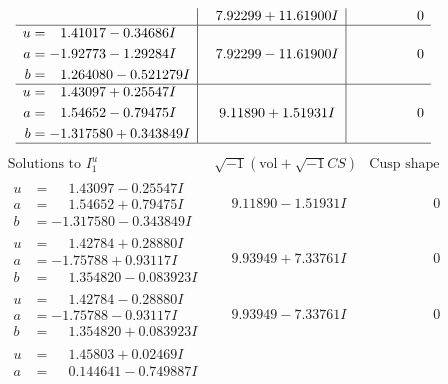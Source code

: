 \documentclass[1p]{elsarticle_modified}
\theoremstyle{definition}
\newcommand{\I}{\sqrt{-1}}
\begin{document}
$$\begin{array}{c|c|c}
 & \phantom{-}7.92299 + 11.61900 I & \phantom{-0.000000 } 0 \\ \hline\begin{aligned}
u &= \phantom{-}1.41017 - 0.34686 I \\
a &= -1.92773 - 1.29284 I \\
b &= \phantom{-}1.264080 - 0.521279 I\end{aligned}
 & \phantom{-}7.92299 - 11.61900 I & \phantom{-0.000000 } 0 \\ \hline\begin{aligned}
u &= \phantom{-}1.43097 + 0.25547 I \\
a &= \phantom{-}1.54652 - 0.79475 I \\
b &= -1.317580 + 0.343849 I\end{aligned}
 & \phantom{-}9.11890 + 1.51931 I & \phantom{-0.000000 } 0\\
 \hline 
 \end{array}$$\newpage$$\begin{array}{c|c|c}  
\text{Solutions to }I^u_{1}& \I (\text{vol} + \sqrt{-1}CS) & \text{Cusp shape}\\
 \hline 
\begin{aligned}
u &= \phantom{-}1.43097 - 0.25547 I \\
a &= \phantom{-}1.54652 + 0.79475 I \\
b &= -1.317580 - 0.343849 I\end{aligned}
 & \phantom{-}9.11890 - 1.51931 I & \phantom{-0.000000 } 0 \\ \hline\begin{aligned}
u &= \phantom{-}1.42784 + 0.28880 I \\
a &= -1.75788 + 0.93117 I \\
b &= \phantom{-}1.354820 - 0.083923 I\end{aligned}
 & \phantom{-}9.93949 + 7.33761 I & \phantom{-0.000000 } 0 \\ \hline\begin{aligned}
u &= \phantom{-}1.42784 - 0.28880 I \\
a &= -1.75788 - 0.93117 I \\
b &= \phantom{-}1.354820 + 0.083923 I\end{aligned}
 & \phantom{-}9.93949 - 7.33761 I & \phantom{-0.000000 } 0 \\ \hline\begin{aligned}
u &= \phantom{-}1.45803 + 0.02469 I \\
a &= \phantom{-}0.144641 - 0.749887 I \\

\end{aligned}
\end{array}$$
\end{document}
